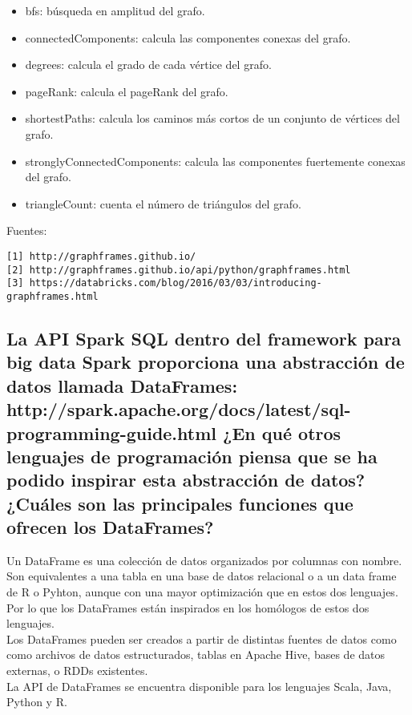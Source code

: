 \documentclass[12pt,a4paper,twoside,openright,titlepage,final]{article}
\begin{document}
\begin{itemize}
	\item bfs: búsqueda en amplitud del grafo.
	\item connectedComponents: calcula las componentes conexas del grafo.
	\item degrees: calcula el grado de cada vértice del grafo.
	\item pageRank: calcula el pageRank del grafo.
	\item shortestPaths: calcula los caminos más cortos de un conjunto de vértices del grafo.
	\item stronglyConnectedComponents: calcula las componentes fuertemente conexas del grafo.
	\item triangleCount: cuenta el número de triángulos del grafo.
\end{itemize}
Fuentes:\\
\begin{verbatim}
[1] http://graphframes.github.io/
[2] http://graphframes.github.io/api/python/graphframes.html
[3] https://databricks.com/blog/2016/03/03/introducing-graphframes.html
\end{verbatim}

\subsection{La API Spark SQL dentro del framework para big data Spark proporciona una abstracción de datos llamada DataFrames: http://spark.apache.org/docs/latest/sql-programming-guide.html ¿En qué otros lenguajes de programación piensa que se ha podido inspirar esta abstracción de datos? ¿Cuáles son las principales funciones que ofrecen los DataFrames?}

Un DataFrame es una colección de datos organizados por columnas con nombre. Son equivalentes a una tabla en una base de datos relacional o a un data frame de R o Pyhton, aunque con una mayor optimización que en estos dos lenguajes. Por lo que los DataFrames están inspirados en los homólogos de estos dos lenguajes.\\

Los DataFrames pueden ser creados a partir de distintas fuentes de datos como como archivos de datos estructurados, tablas en Apache Hive, bases de datos externas, o RDDs existentes.\\

La API de DataFrames se encuentra disponible para los lenguajes Scala, Java, Python y R.\\
\end{document}
